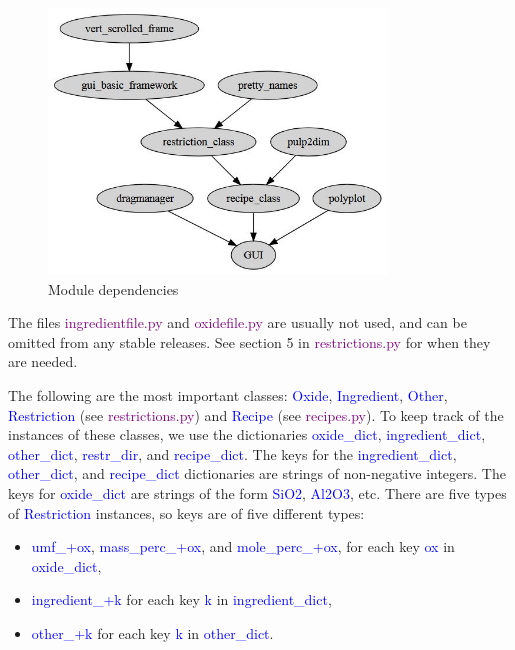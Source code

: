 \documentclass[a4paper,10pt]{article}
\def\'{\textquotesingle}
\def\blue{\textcolor{blue}}
\def\green{\textcolor{Purple}}
\begin{document}

\begin{figure}[ht!]
\centering
\includegraphics[width=90mm]{Module_dependencies.jpg}
\caption{Module dependencies \label{dep}}
\end{figure}

The files \green{ingredientfile.py} and \green{oxidefile.py} are usually not used, and can be omitted from any stable releases. See section 5 in \green{restrictions.py} for when they are needed.

The following are the most important classes: \blue{Oxide}, \blue{Ingredient}, \blue{Other}, \blue{Restriction} (see \green{restrictions.py}) and \blue{Recipe} (see \green{recipes.py}). To keep track of the instances of these classes, we use the dictionaries \blue{oxide\_dict}, \blue{ingredient\_dict}, \blue{other\_dict}, \blue{restr\_dir}, and \blue{recipe\_dict}. The keys for the \blue{ingredient\_dict}, \newline \blue{other\_dict}, and \blue{recipe\_dict} dictionaries are strings of non-negative integers. The keys for \blue{oxide\_dict} are strings of the form \blue{\'SiO2\'}, \blue{\'Al2O3\'}, etc.  There are five types of \blue{Restriction} instances, so keys are of five different types:
\begin{itemize}
\item \blue{\'umf\_\'+ox}, \blue{\'mass\_perc\_\'+ox}, and \blue{\'mole\_perc\_\'+ox}, for each key \blue{ox} in \blue{oxide\_dict},
\item \blue{\'ingredient\_\'+k} for each key \blue{k} in \blue{ingredient\_dict}, 
\item \blue{\'other\_\'+k} for each key \blue{k} in \blue{other\_dict}. 
\end{itemize}
\end{document}
